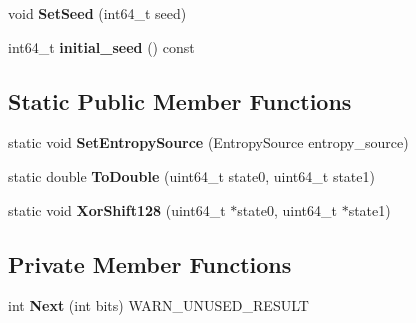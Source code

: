 \begin{DoxyCompactItemize}
\item 
void {\bfseries Set\+Seed} (int64\+\_\+t seed)\hypertarget{classv8_1_1base_1_1_random_number_generator_a09f96e1c329a56aa6c62b21c2d97d188}{}\label{classv8_1_1base_1_1_random_number_generator_a09f96e1c329a56aa6c62b21c2d97d188}

\item 
int64\+\_\+t {\bfseries initial\+\_\+seed} () const \hypertarget{classv8_1_1base_1_1_random_number_generator_a24a2a6767b1a2de02f681bca920f9f14}{}\label{classv8_1_1base_1_1_random_number_generator_a24a2a6767b1a2de02f681bca920f9f14}

\end{DoxyCompactItemize}
\subsection*{Static Public Member Functions}
\begin{DoxyCompactItemize}
\item 
static void {\bfseries Set\+Entropy\+Source} (Entropy\+Source entropy\+\_\+source)\hypertarget{classv8_1_1base_1_1_random_number_generator_ae97b331c6a33123e8571f93aaeaea164}{}\label{classv8_1_1base_1_1_random_number_generator_ae97b331c6a33123e8571f93aaeaea164}

\item 
static double {\bfseries To\+Double} (uint64\+\_\+t state0, uint64\+\_\+t state1)\hypertarget{classv8_1_1base_1_1_random_number_generator_a1f4ca0c84b44f1baf9eb20b6e6b4b938}{}\label{classv8_1_1base_1_1_random_number_generator_a1f4ca0c84b44f1baf9eb20b6e6b4b938}

\item 
static void {\bfseries Xor\+Shift128} (uint64\+\_\+t $\ast$state0, uint64\+\_\+t $\ast$state1)\hypertarget{classv8_1_1base_1_1_random_number_generator_aed81ac9a466d6f8c981f13909574b1cf}{}\label{classv8_1_1base_1_1_random_number_generator_aed81ac9a466d6f8c981f13909574b1cf}

\end{DoxyCompactItemize}
\subsection*{Private Member Functions}
\begin{DoxyCompactItemize}
\item 
int {\bfseries Next} (int bits) W\+A\+R\+N\+\_\+\+U\+N\+U\+S\+E\+D\+\_\+\+R\+E\+S\+U\+LT\hypertarget{classv8_1_1base_1_1_random_number_generator_a347911608f196e255860858afb562073}{}\label{classv8_1_1base_1_1_random_number_generator_a347911608f196e255860858afb562073}

\end{DoxyCompactItemize}
